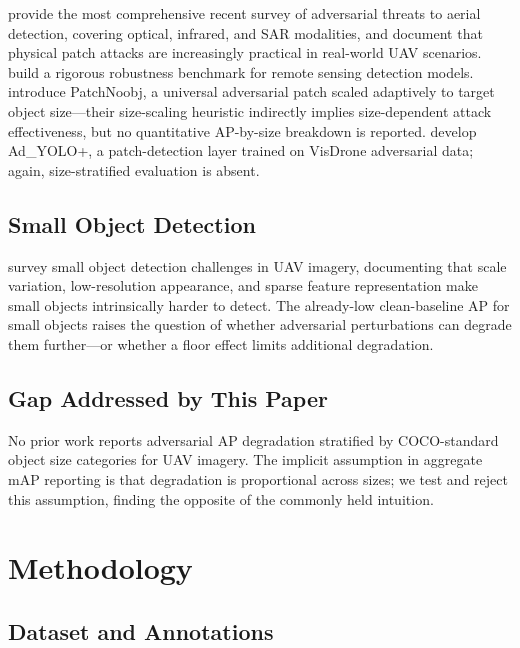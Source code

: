\documentclass[journal]{IEEEtran}
\begin{document}
\citet{frontiers2024aerial} provide the most comprehensive
recent survey of adversarial threats to aerial detection,
covering optical, infrared, and SAR modalities, and document
that physical patch attacks are increasingly practical
in real-world UAV scenarios.
\citet{remoteSensing2024benchmark} build a rigorous robustness
benchmark for remote sensing detection models.
\citet{patchNoobj2024} introduce PatchNoobj, a universal
adversarial patch scaled adaptively to target object
size---their size-scaling heuristic indirectly implies
size-dependent attack effectiveness, but no quantitative
AP-by-size breakdown is reported.
\citet{adYolo2024} develop Ad\_YOLO+, a patch-detection layer
trained on VisDrone adversarial data; again, size-stratified
evaluation is absent.

\subsection{Small Object Detection}

\citet{smallObjSurvey2025} survey small object detection
challenges in UAV imagery, documenting that scale variation,
low-resolution appearance, and sparse feature representation
make small objects intrinsically harder to detect.
The already-low clean-baseline AP for small objects raises the
question of whether adversarial perturbations can degrade them
further---or whether a floor effect limits additional degradation.

\subsection{Gap Addressed by This Paper}

No prior work reports adversarial AP degradation stratified
by COCO-standard object size categories for UAV imagery.
The implicit assumption in aggregate mAP reporting is that
degradation is proportional across sizes; we test and reject
this assumption, finding the opposite of the commonly held
intuition.

\section{Methodology}
\label{sec:method}

\subsection{Dataset and Annotations}
\end{document}
